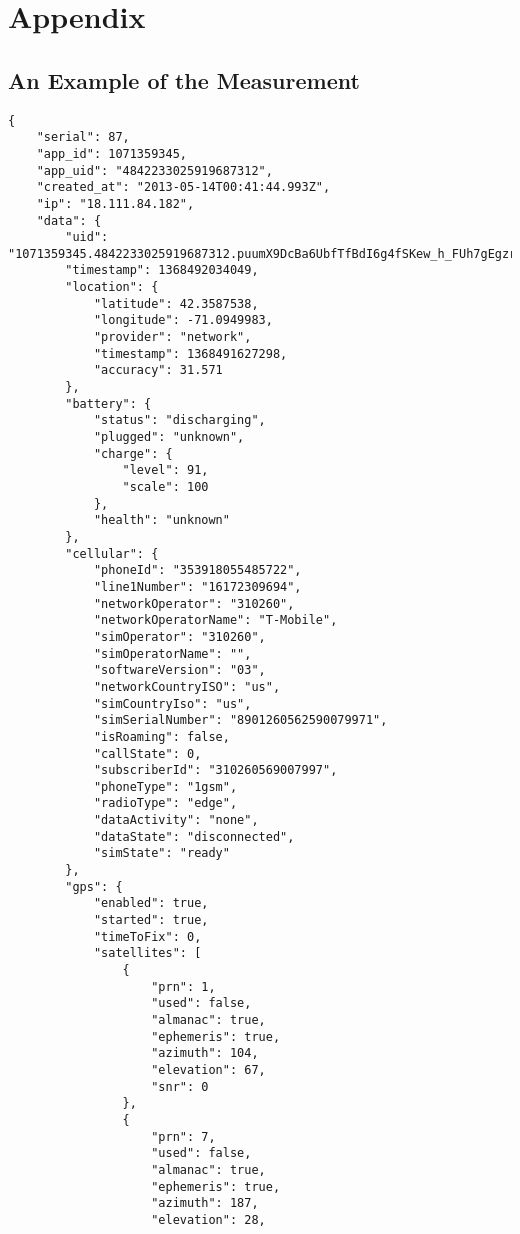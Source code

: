 \section{Appendix}
\label{s:appendix}

\subsection{An Example of the Measurement}
\tiny
\begin{verbatim}
{
    "serial": 87,
    "app_id": 1071359345,
    "app_uid": "4842233025919687312",
    "created_at": "2013-05-14T00:41:44.993Z",
    "ip": "18.111.84.182",
    "data": {
        "uid": "1071359345.4842233025919687312.puumX9DcBa6UbfTfBdI6g4fSKew_h_FUh7gEgzrUGBM",
        "timestamp": 1368492034049,
        "location": {
            "latitude": 42.3587538,
            "longitude": -71.0949983,
            "provider": "network",
            "timestamp": 1368491627298,
            "accuracy": 31.571
        },
        "battery": {
            "status": "discharging",
            "plugged": "unknown",
            "charge": {
                "level": 91,
                "scale": 100
            },
            "health": "unknown"
        },
        "cellular": {
            "phoneId": "353918055485722",
            "line1Number": "16172309694",
            "networkOperator": "310260",
            "networkOperatorName": "T-Mobile",
            "simOperator": "310260",
            "simOperatorName": "",
            "softwareVersion": "03",
            "networkCountryISO": "us",
            "simCountryIso": "us",
            "simSerialNumber": "8901260562590079971",
            "isRoaming": false,
            "callState": 0,
            "subscriberId": "310260569007997",
            "phoneType": "1gsm",
            "radioType": "edge",
            "dataActivity": "none",
            "dataState": "disconnected",
            "simState": "ready"
        },
        "gps": {
            "enabled": true,
            "started": true,
            "timeToFix": 0,
            "satellites": [
                {
                    "prn": 1,
                    "used": false,
                    "almanac": true,
                    "ephemeris": true,
                    "azimuth": 104,
                    "elevation": 67,
                    "snr": 0
                },
                {
                    "prn": 7,
                    "used": false,
                    "almanac": true,
                    "ephemeris": true,
                    "azimuth": 187,
                    "elevation": 28,

\end{verbatim}
